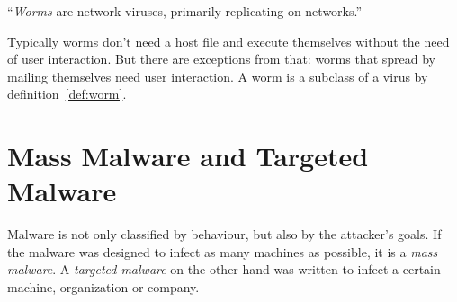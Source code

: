 \begin{definition}[Worm]
\enquote{\emph{Worms} are network viruses, primarily replicating on networks.} \cite[]{szor05} \label{def:worm}
\end{definition} 

Typically worms don't need a host file and execute themselves without the need of user interaction. \cite[]{szor05} But there are exceptions from that: \eg{} worms that spread by mailing themselves need user interaction.
A worm is a subclass of a virus by definition~\ref{def:worm}.

\section{Mass Malware and Targeted Malware}

Malware is not only classified by behaviour, but also by the attacker's goals. If the malware was designed to infect as many machines as possible, it is a \emph{mass malware}. A \emph{targeted malware} on the other hand was written to infect a certain machine, organization or company.
